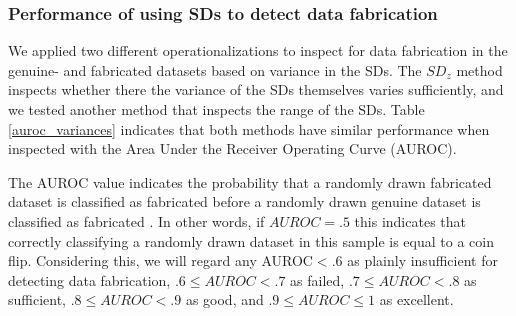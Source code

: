 \documentclass{article}
\begin{document}
\subsubsection*{Performance of using SDs to detect data fabrication}

We applied two different operationalizations to inspect for data fabrication in the genuine- and fabricated datasets based on variance in the SDs. The $SD_z$ method \citep{simonsohn2013} inspects whether there the variance of the SDs themselves varies sufficiently, and we tested another method that inspects the range of the SDs. Table \ref{auroc_variances} indicates that both methods have similar performance when inspected with the Area Under the Receiver Operating Curve (AUROC). 

The AUROC value indicates the probability that a randomly drawn fabricated dataset is classified as fabricated before a randomly drawn genuine dataset is classified as fabricated \citep{doi:10.1148/radiology.143.1.7063747}. In other words, if $AUROC=.5$ this indicates that correctly classifying a randomly drawn dataset in this sample is equal to a coin flip. Considering this, we will regard any AUROC$<.6$ as plainly insufficient for detecting data fabrication, $.6\leq AUROC<.7$ as failed, $.7\leq AUROC<.8$ as sufficient, $.8\leq AUROC<.9$ as good, and $.9\leq AUROC\leq 1$ as excellent.
\end{document}
